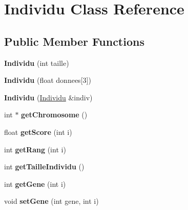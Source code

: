 \hypertarget{class_individu}{}\section{Individu Class Reference}
\label{class_individu}
\subsection*{Public Member Functions}
\begin{DoxyCompactItemize}
\item 
\mbox{\label{class_individu_aeb49b6d2654ce47c70847d27a2608b47}} 
{\bfseries Individu} (int taille)
\item 
\mbox{\label{class_individu_a04a849ab0b64d2bcb16cb8ce14c41f62}} 
{\bfseries Individu} (float donnees\mbox{[}3\mbox{]})
\item 
\mbox{\label{class_individu_a19231c25e7cc1439625cae19c88d6f7e}} 
{\bfseries Individu} (\hyperlink{class_individu}{Individu} \&indiv)
\item 
\mbox{\label{class_individu_a21eb80ae0dd199cb4b723664157ab2e2}} 
int $\ast$ {\bfseries get\+Chromosome} ()
\item 
\mbox{\label{class_individu_a1da47ceca45e43d0815edb13d0ee09ee}} 
float {\bfseries get\+Score} (int i)
\item 
\mbox{\label{class_individu_a68cbd354d58bff595f2032e813cf3af8}} 
int {\bfseries get\+Rang} (int i)
\item 
\mbox{\label{class_individu_ab05eebba0ec6d0e728384da2c06407c3}} 
int {\bfseries get\+Taille\+Individu} ()
\item 
\mbox{\label{class_individu_ad55048b09101f7d296c8e79c62daddac}} 
int {\bfseries get\+Gene} (int i)
\item 
\mbox{\label{class_individu_a3b3dab8bc62e405506e9b7a7325ad410}} 
void {\bfseries set\+Gene} (int gene, int i)
\item 
\mbox{\label{class_individu_a2d678fe842fa537c79b56775bdd3d64b}} 

\end{DoxyCompactItemize}
